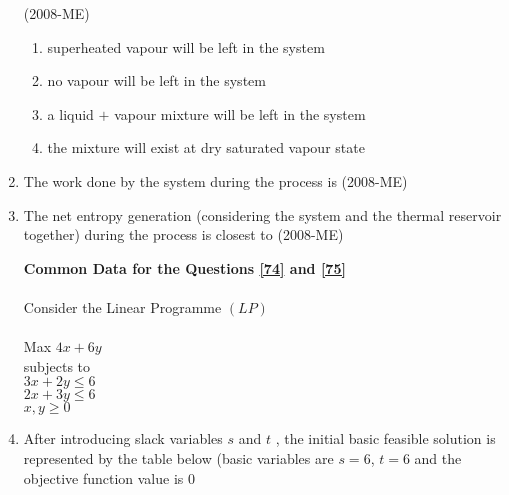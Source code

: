 \documentclass[journal]{IEEEtran}
\begin{document}
\begin{enumerate}
 \hfill(2008-ME)
 \begin{enumerate}
     \item superheated vapour will be left in the system 
     \item no vapour will be left in the system 
     \item a liquid $+$ vapour mixture will be left in the system 
     \item the mixture will exist at dry saturated vapour state 
 \end{enumerate}
 \item The work done by the system during the process is \label{72} \hfill(2008-ME) 
 \begin{enumerate}
 \end{enumerate}
\item The net entropy generation (considering the system and the thermal reservoir together) during the process is closest to \label{73} \hfill(2008-ME)
\begin{enumerate}
\end{enumerate}
\textbf{Common Data for the Questions \ref{74} and \ref{75}} \\ \\
Consider the Linear Programme $(LP)$ \\ \\
Max $4x+6y$ \\ subjects to \\ $3x+2y \leq 6$ \\ $2x+3y \leq 6$ \\
$x,y \geq 0$ \\ 
\item After introducing slack variables $s$
 and $t$
, the initial basic feasible solution is represented by the table below (basic variables are $s = 6$, $t = 6$
 and the objective function value is $0$

\end{enumerate}
\end{document}
